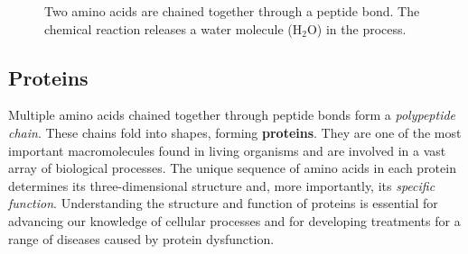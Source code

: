 \begin{figure}
    \centering
    \caption{Two amino acids are chained together through a peptide bond. The chemical reaction releases a water molecule ($\text{H}_2\text{O}$) in the process.}
    \label{fig:residue}
\end{figure}

\subsection{Proteins}
Multiple amino acids chained together through peptide bonds form a \textit{polypeptide chain}.
These chains fold into shapes, forming \textbf{proteins}. 
They are one of the most important macromolecules found in living organisms and are involved in a vast array of biological processes. 
The unique sequence of amino acids in each protein determines its three-dimensional structure and, more importantly, its \textit{specific function}. 
Understanding the structure and function of proteins is essential for advancing our knowledge of cellular processes and for developing treatments for a range of diseases caused by protein dysfunction.


